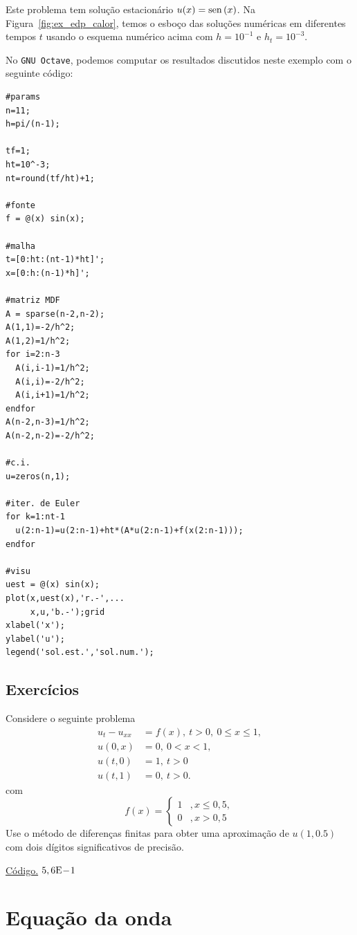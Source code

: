 \begin{ex}
Este problema tem solução estacionário $u(x) = \operatorname{sen}\,(x)$. Na Figura~\ref{fig:ex_edp_calor}, temos o esboço das soluções numéricas em diferentes tempos $t$ usando o esquema numérico acima com $h=10^{-1}$ e $h_t=10^{-3}$.

\ifisoctave
No \verb+GNU Octave+, podemos computar os resultados discutidos neste exemplo com o seguinte código:
\begin{verbatim}
#params
n=11;
h=pi/(n-1);

tf=1;
ht=10^-3;
nt=round(tf/ht)+1;

#fonte
f = @(x) sin(x);

#malha
t=[0:ht:(nt-1)*ht]'; 
x=[0:h:(n-1)*h]';

#matriz MDF
A = sparse(n-2,n-2);
A(1,1)=-2/h^2;
A(1,2)=1/h^2;
for i=2:n-3
  A(i,i-1)=1/h^2;
  A(i,i)=-2/h^2;
  A(i,i+1)=1/h^2;
endfor
A(n-2,n-3)=1/h^2;
A(n-2,n-2)=-2/h^2;

#c.i.
u=zeros(n,1);

#iter. de Euler
for k=1:nt-1
  u(2:n-1)=u(2:n-1)+ht*(A*u(2:n-1)+f(x(2:n-1)));
endfor

#visu
uest = @(x) sin(x);
plot(x,uest(x),'r.-',...
     x,u,'b.-');grid
xlabel('x');
ylabel('u');
legend('sol.est.','sol.num.');
\end{verbatim}
\fi
\end{ex}

\subsection*{Exercícios}

\begin{exer}
  Considere o seguinte problema
  \begin{align}
    u_t - u_{xx} &= f(x),~t>0,~0\leq x \leq 1,\\
    u(0,x) &= 0,~0<x<1,\\
    u(t,0) &= 1,~t>0\\
    u(t,1) &= 0,~t>0.
  \end{align}
com
\begin{equation}
  f(x) = \left\{
    \begin{array}{ll}
      1 &, x\leq 0,5,\\
      0 &, x>0,5
    \end{array}
\right.
\end{equation}
Use o método de diferenças finitas para obter uma aproximação de $u(1,0.5)$ com dois dígitos significativos de precisão.
\end{exer}
\begin{resp}
  \ifisoctave 
  \href{https://github.com/phkonzen/notas/blob/master/src/MatematicaNumerica/cap_edp/dados/exer_edp_calor_1/exer_edp_calor_1.m}{Código.} 
  \fi
  $5,6\mathrm{E}\!-\!1$
\end{resp}

\section{Equação da onda}\label{cap_edp_sec_onda}

\emconstrucao